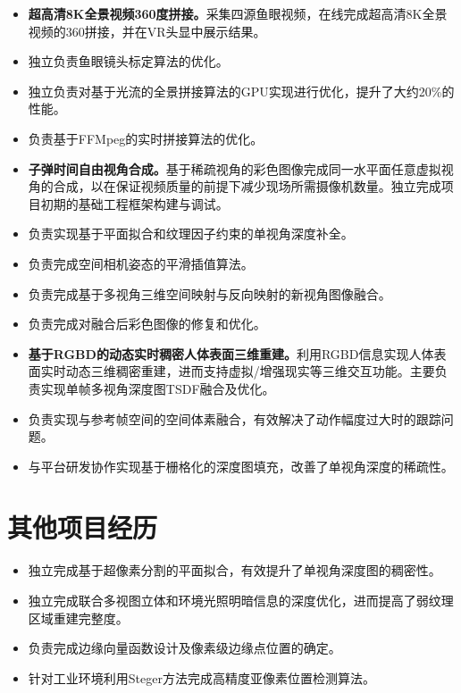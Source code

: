 \documentclass{resume}
\begin{document}
\begin{itemize}
  \item \textbf{超高清8K全景视频360度拼接。}采集四源鱼眼视频，在线完成超高清8K全景视频的360拼接，并在VR头显中展示结果。
  \item 独立负责鱼眼镜头标定算法的优化。
  \item 独立负责对基于光流的全景拼接算法的GPU实现进行优化，提升了大约20\%的性能。
  \item 负责基于FFMpeg的实时拼接算法的优化。
\end{itemize}

\begin{itemize}
  \item \textbf{子弹时间自由视角合成。}基于稀疏视角的彩色图像完成同一水平面任意虚拟视角的合成，以在保证视频质量的前提下减少现场所需摄像机数量。独立完成项目初期的基础工程框架构建与调试。
  \item 负责实现基于平面拟合和纹理因子约束的单视角深度补全。
  \item 负责完成空间相机姿态的平滑插值算法。
  \item 负责完成基于多视角三维空间映射与反向映射的新视角图像融合。
  \item 负责完成对融合后彩色图像的修复和优化。
\end{itemize}

\begin{itemize}
  \item \textbf{基于RGBD的动态实时稠密人体表面三维重建。}利用RGBD信息实现人体表面实时动态三维稠密重建，进而支持虚拟/增强现实等三维交互功能。主要负责实现单帧多视角深度图TSDF融合及优化。
  \item 负责实现与参考帧空间的空间体素融合，有效解决了动作幅度过大时的跟踪问题。
  \item 与平台研发协作实现基于栅格化的深度图填充，改善了单视角深度的稀疏性。
\end{itemize}

\section{其他项目经历}
\begin{itemize}
  \item 独立完成基于超像素分割的平面拟合，有效提升了单视角深度图的稠密性。
  \item 独立完成联合多视图立体和环境光照明暗信息的深度优化，进而提高了弱纹理区域重建完整度。
\end{itemize}
\begin{itemize}
  \item 负责完成边缘向量函数设计及像素级边缘点位置的确定。
  \item 针对工业环境利用Steger方法完成高精度亚像素位置检测算法。
\end{itemize}
\end{document}

